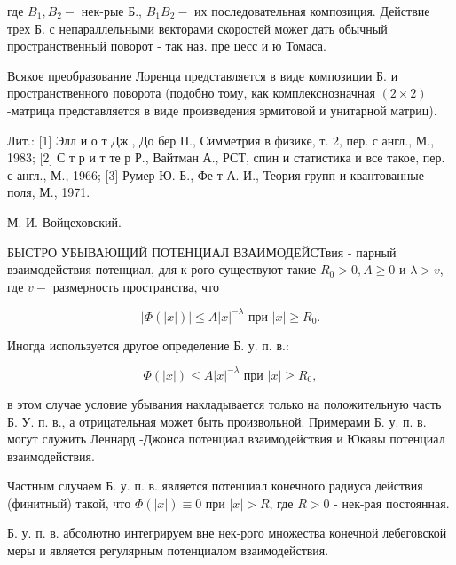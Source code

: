 \documentclass[10pt]{article}
\begin{document}
где $B_{1}, B_{2}-$ нек-рые Б., $B_{1} B_{2}-$ их последовательная композиция. Действие трех Б. с непараллельными векторами скоростей может дать обычный пространственный поворот - так наз. пре цесс и ю Томаса.



Всякое преобразование Лоренца представляется в виде композиции Б. и пространственного поворота (подобно тому, как комплекснозначная $(2 \times 2)$-матрица представляется в виде произведения эрмитовой и унитарной матриц).



Лит.: [1] Элл и о т Дж., До бер П., Симметрия в физике, т. 2, пер. с англ., М., 1983; [2] С т р и т те р Р., Вайтман А., РСТ, спин и статистика и все такое, пер. с англ., М., 1966; [3] Румер Ю. Б., Фе т А. И., Теория групп и квантованные поля, М., 1971.



М. И. Войцеховский.



БЫСТРО УБЫВАЮЩИЙ ПОТЕНЦИАЛ ВЗАИМОДЕЙСТвия - парный взаимодействия потенциал, для к-рого существуют такие $R_{0}>0, A \geqslant 0$ и $\lambda>v$, где $v-$ размерность пространства, что



\[

|\Phi(|x|)| \leqslant A|x|^{-\lambda} \text { при }|x| \geqslant R_{0} .

\]



Иногда используется другое определение Б. у. п. в.:



\[

\Phi(|x|) \leqslant A|x|^{-\lambda} \text { при }|x| \geqslant R_{0},

\]



в этом случае условие убывания накладывается только на положительную часть Б. У. п. в., а отрицательная может быть произвольной. Примерами Б. у. п. в. могут служить Леннард -Джонса потенциал взаимодействия и Юкавы потенциал взаимодействия.



Частным случаем Б. у. п. в. является потенциал конечного радиуса действия (финитный) такой, что $\Phi(|x|) \equiv 0$ при $|x|>R$, где $R>0$ - нек-рая постоянная.



Б. у. п. в. абсолютно интегрируем вне нек-рого множества конечной лебеговской меры и является регулярным потенциалом взаимодействия.
\end{document}
